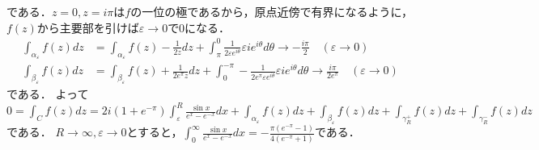 \documentclass[
		book,
		head_space=20mm,
		foot_space=20mm,
		gutter=10mm,
		line_length=190mm
]{jlreq}
\begin{document}
である．$z=0,z=i\pi$は$f$の一位の極であるから，原点近傍で有界になるように，$f(z)$から主要部を引けば$\varepsilon\rightarrow0$で0になる．
\begin{align}
    \int_{\alpha_{\varepsilon}}f(z)dz&=\int_{\alpha_\varepsilon}f(z)-\frac{1}{2z}dz+\int_{\pi}^0 \frac{1}{2\varepsilon e^{i\theta}}\varepsilon ie^{i\theta }d\theta\rightarrow -\frac{i\pi}{2}\quad(\varepsilon\rightarrow0)\\
    \int_{\beta_{\varepsilon}}f(z)dz&=\int_{\beta_\varepsilon}f(z)+\frac{1}{2e^\pi z}dz+\int_{0}^{-\pi} -\frac{1}{2e^\pi \varepsilon e^{i\theta}}\varepsilon ie^{i\theta }d\theta\rightarrow\frac{i\pi}{2e^\pi}\quad(\varepsilon\rightarrow0)
\end{align}である．
よって$0=\int_C f(z)dz=2i(1+e^{-\pi})\int_{\varepsilon}^R \frac{\sin x}{e^x-e^{-x}}dx+\int_{\alpha_\varepsilon}f(z)dz+\int_{\beta_\varepsilon}f(z)dz+\int_{\gamma_R^+}f(z)dz+\int_{\gamma_R^-}f(z)dz$である．
$R\rightarrow \infty,\varepsilon \rightarrow 0$とすると，$\int_0^\infty \frac{\sin x}{e^x-e^{-x}}dx=-\frac{\pi(e^{-\pi}-1)}{4(e^{-\pi}+1)}$である．
\end{document}

